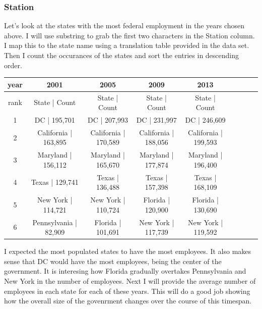 \documentclass{article}
\begin{document}
        \subsubsection{Station}
        Let's look at the states with the most federal employment in the years chosen above. I will use substring to grab the first two characters in the Station column. I map this to the state name using a translation table provided in the data set. Then I count the occurances of the states and sort the entries in descending order.

            \begin{center}
                \begin{tabular}{ |c|c|c|c|c|c|c|c|c| }
                    \hline
                    year & 2001 & 2005 & 2009 & 2013 \\
                    \hline
                    rank & State | Count & State | Count & State | Count & State | Count \\
                    \hline
                    1 & DC | 195,701 & DC | 207,993 & DC | 231,997 & DC | 246,609 \\
                    2 & California | 163,895 & California | 170,589 & California | 188,056 & California | 199,593 \\
                    3 & Maryland | 156,112 & Maryland | 165,670 & Maryland | 177,874 & Maryland | 196,400 \\
                    4 & Texas | 129,741 & Texas | 136,488 & Texas | 157,398 & Texas | 168,109 \\
                    5 & New York | 114,721 & New York | 110,724 & Florida | 120,900 & Florida | 130,690 \\
                    6 & Pennsylvania | 82,909 & Florida | 101,691 & New York | 117,739 & New York | 119,592 \\
                    \hline
                \end{tabular}
            \end{center}

        I expected the most populated states to have the most employees. It also makes sense that DC would have the most employees, being the center of the government. It is interesing how Florida gradually overtakes Pennsylvania and New York in the number of employees. Next I will provide the average number of employees in each state for each of these years. This will do a good job showing how the overall size of the govenrment changes over the course of this timespan.
\end{document}
